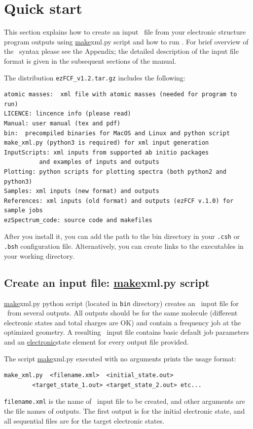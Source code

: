 \documentclass[11pt]{article}
\begin{document}
\section{Quick start}

This section explains how to create an input \xml\ file from your electronic structure 
program outputs using \ul{make}{xml.py} script and how to run \ezFCF.
For brief overview of the \xml\ syntax please see the Appendix;
the detailed description of the input file format is given in the  
subsequent sections of the manual. 

The distribution \verb|ezFCF_v1.2.tar.gz| includes the following:
\begin{verbatim}
atomic masses:  xml file with atomic masses (needed for program to run)
LICENCE: lincence info (please read)
Manual: user manual (tex and pdf)
bin:  precompiled binaries for MacOS and Linux and python script
make_xml.py (python3 is required) for xml input generation 
InputScripts: xml inputs from supported ab initio packages
	      and examples of inputs and outputs  
Plotting: python scripts for plotting spectra (both python2 and python3)
Samples: xml inputs (new format) and outputs 
References: xml inputs (old format) and outputs (ezFCF v.1.0) for sample jobs
ezSpectrum_code: source code and makefiles
\end{verbatim}
After you install it, you can add the path to the bin directory in your \verb|.csh| or \verb|.bsh| configuration file.
Alternatively, you can create links to the executables in your working directory.

\subsection{Create an input file: \ul{make}{xml.py} script}
\label{sec:script}

\ul{make}{xml.py} python script (located in {\tt bin} directory)
creates an \xml\ input file for \ezFCF\ from several \ai outputs. 
All \ai outputs should be for the same molecule (different electronic states and total charges are OK) 
and contain a frequency job at the optimized geometry. 
A resulting \xml\ input file contains basic default job parameters and an \ul{electronic}{state} element 
for every output file provided. 

The script \ul{make}{xml.py} executed with no arguments prints the usage format:
\begin{lstlisting}[frame=single,framerule=0pt]
  make_xml.py  <filename.xml>  <initial_state.out>
        <target_state_1.out> <target_state_2.out> etc...
\end{lstlisting}
{\tt filename.xml} is the name of \xml\ input file to be  created,
and other arguments are the file names of \ai outputs.
The first output is for the initial electronic state,
and all sequential files are for the target electronic states.
\end{document}
